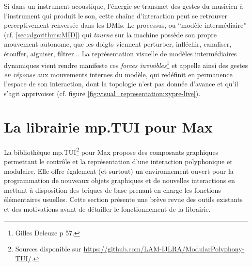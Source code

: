 \noindent Si dans un instrument acoustique, l'énergie se transmet des gestes du musicien à l'instrument qui produit le son, cette chaîne d'interaction peut se retrouver perceptivement renversée dans les \glspl{DMI}. Le processus, ou ``modèle intermédiaire'' (cf. \ref{sec:algorithms:MID}) qui \textit{tourne} sur la machine possède son propre mouvement autonome, que les doigts viennent perturber, infléchir, canaliser, étouffer, aiguiser, filtrer... La représentation visuelle de modèles intermédiaires dynamiques vient rendre manifeste ces \textit{forces invisibles}\footnote{ Gilles Deleuze \cite{deleuze_francis_1981} p 57.} et appelle ainsi des gestes \textit{en réponse} aux mouvements internes du modèle, qui redéfinit en permanence l'espace de son interaction, dont la topologie n'est pas donnée d'avance et qu'il s'agit apprivoiser (cf. figure \ref{fig:visual_representation:xypre-live}).




\section{La librairie mp.TUI pour Max}


\noindent La bibliothèque mp.TUI\footnote{Sources disponible sur \url{https://github.com/LAM-IJLRA/ModularPolyphony-TUI/}.} pour Max propose des composants graphiques permettant le contrôle et la représentation d'une interaction polyphonique et modulaire. Elle offre également (et surtout) un environnement ouvert pour la programmation de nouveaux objets graphiques et de nouvelles interactions en mettant à disposition des briques de base prenant en charge les fonctions élémentaires usuelles. Cette section présente une brève revue des outils existants et des motivations avant de détailler le fonctionnement de la librairie.

